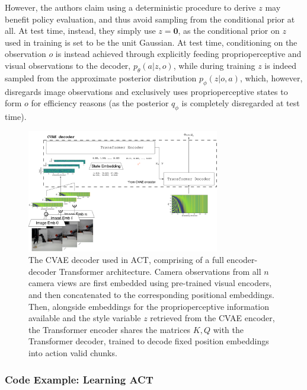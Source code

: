 However, the authors claim using a deterministic procedure to derive \( z \) may benefit policy evaluation, and thus avoid sampling from the conditional prior at all.
At test time, instead, they simply use \( z = \mathbf{0} \), as the conditional prior on \( z \) used in training is set to be the unit Gaussian.
At test time, conditioning on the observation \( o \) is instead achieved through explicitly feeding proprioperceptive and visual observations to the decoder, \( p_\theta(a \vert z, o) \), while during training \( z \) is indeed sampled from the approximate posterior distribution \(p_\phi(z \vert o, a)\), which, however, disregards image observations and exclusively uses proprioperceptive states to form \( o \) for efficiency reasons (as the posterior \(q_\phi \) is completely disregarded at test time).

\begin{figure}
    \centering
    \includegraphics[width=0.75\textwidth]{figures/ch4/ch4-act-decoder.png}
    \caption{The CVAE decoder used in ACT, comprising of a full encoder-decoder Transformer architecture. Camera observations from all \( n \) camera views are first embedded using pre-trained visual encoders, and then concatenated to the corresponding positional embeddings. Then, alongside embeddings for the proprioperceptive information available and the style variable \(z\) retrieved from the CVAE encoder, the Transformer encoder shares the matrices \( K,Q \) with the Transformer decoder, trained to decode fixed position embeddings into action valid chunks.}
    \label{fig:ch4-act-decoder}
\end{figure}


\subsubsection{Code Example: Learning ACT}

